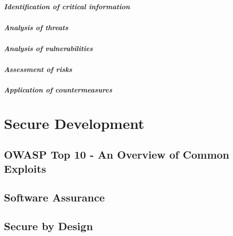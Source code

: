 \subparagraph{Identification of critical information}

\subparagraph{Analysis of threats}

\subparagraph{Analysis of vulnerabilities}

\subparagraph{Assessment of risks}

\subparagraph{Application of countermeasures}

\section{Secure Development}

\subsection{OWASP Top 10 - An Overview of Common Exploits}

\subsection{Software Assurance}

\subsection{Secure by Design}



